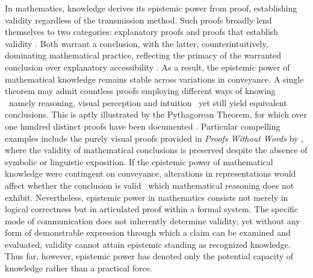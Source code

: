 \documentclass[12pt]{article}
\begin{document}
In mathematics, knowledge derives its epistemic power from proof, establishing validity regardless of the transmission method. Such proofs broadly lend themselves to two categories: explanatory proofs and proofs that establish validity \parencite{HannaGila1989}. Both warrant a conclusion, with the latter, counterintuitively, dominating mathematical practice, reflecting the primacy of the warranted conclusion over explanatory accessibility \parencite{Mizrahi2020-MIZPEA}. As a result, the epistemic power of mathematical knowledge remains stable across variations in conveyance. A single theorem may admit countless proofs employing different ways of knowing \textemdash\ namely reasoning, visual perception and intuition \textemdash\ yet still yield equivalent conclusions. This is aptly illustrated by the Pythagorean Theorem, for which over one hundred distinct proofs have been documented \parencite{Bogomolny_Pythagorean}. Particular compelling examples include the purely visual proofs provided in \textit{Proofs Without Words} by \textcite{nelsen1993proofs}, where the validity of mathematical conclusions is preserved despite the absence of symbolic or linguistic exposition. If the epistemic power of mathematical knowledge were contingent on conveyance, alterations in representations would affect whether the conclusion is valid \textemdash\ which mathematical reasoning does not exhibit. Nevertheless, epistemic power in mathematics consists not merely in logical correctness but in articulated proof within a formal system. The specific mode of communication does not inherently determine validity; yet without any form of demonstrable expression through which a claim can be examined and evaluated, validity cannot attain epistemic standing as recognized knowledge. Thus far, however, epistemic power has denoted only the potential capacity of knowledge rather than a practical force.
\end{document}

